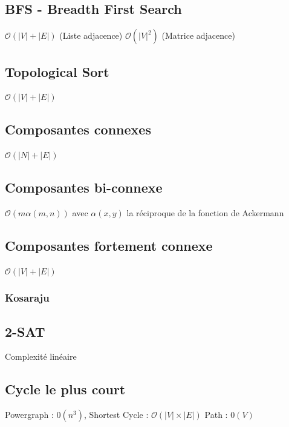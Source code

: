 \documentclass[8pt]{article}
\begin{document}
        \subsection{BFS - Breadth First Search}
        $\mathcal{O}(\lvert V \rvert  + \lvert E \rvert)$ (Liste adjacence) $\mathcal{O}(\lvert V \rvert ^2)$ (Matrice adjacence)
        {\scriptsize}
        \subsection{Topological Sort}
        $\mathcal{O}(\lvert V \rvert  + \lvert E \rvert)$
        {\scriptsize}
        \subsection{Composantes connexes}
        $\mathcal{O}(\lvert N \rvert  + \lvert E \rvert)$
        {\scriptsize}
        \subsection{Composantes bi-connexe}
        $\mathcal{O}(m \alpha(m,n))$ avec $\alpha(x,y)$ la réciproque de la fonction de Ackermann 
        {\scriptsize}
        \subsection{Composantes fortement connexe}
            $\mathcal{O}(\lvert V \rvert  + \lvert E \rvert)$
            \subsubsection{Kosaraju}
            {\scriptsize}
        \subsection{2-SAT}
        Complexité linéaire
        {\scriptsize}
        \subsection{Cycle le plus court}
        Powergraph : $\mathcal{0}(n^3)$, Shortest Cycle : $\mathcal{O}(\lvert V \rvert  \times \lvert E \rvert)$ 
        Path : $\mathcal{0}(V)$
        {\scriptsize}
\end{document}

